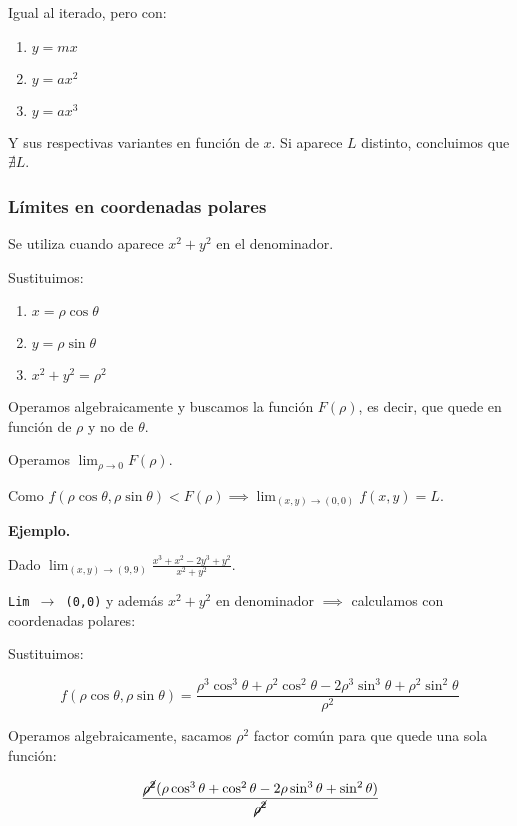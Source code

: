 Igual al iterado, pero con:

\begin{enumerate}
    \item \(y = mx\)
    \item \(y = ax^{2}\)
    \item \(y = ax^{3}\)
\end{enumerate}

Y sus respectivas variantes en función de \(x\).
Si aparece \(L\) distinto, concluimos que \(\nexists L\).

\subsubsection{Límites en coordenadas polares}


Se utiliza cuando aparece \(x^{2} + y^{2}\) en el denominador.

Sustituimos:
\begin{enumerate}
    \item \(x = \rho \cos\theta\)
    \item \(y = \rho \sin\theta\)
    \item \(x^{2} + y^{2} = \rho^{2}\)
\end{enumerate}

Operamos algebraicamente y buscamos la función \(F(\rho)\),
es decir, que quede en función de \(\rho\) y no de \(\theta\).

Operamos \(\lim_{\rho\to0} F(\rho)\).

Como \(f(\rho\cos\theta,\rho\sin\theta) < F(\rho) \implies \lim_{(x,y)\to(0,0)}f(x,y) = L\).

\textbf{Ejemplo.}

Dado \(\lim_{(x,y)\to(9,9)}\frac{x^{3} + x^{2} - 2y^{3} + y^{2}}{x^{2} + y^{2}}\).

\texttt{Lim \(\to\) (0,0)} y además \texttt{\(x^{2} + y^{2}\)} en denominador \(\implies\) calculamos con coordenadas polares:

Sustituimos:

\begin{equation*}
    f(\rho\cos\theta,\rho\sin\theta) = \frac{\rho^{3}\cos^{3}\theta + \rho^{2}\cos^{2}\theta - 2\rho^{3}\sin^{3}\theta + \rho^{2}\sin^{2}\theta}{\rho^{2}}
\end{equation*}

Operamos algebraicamente, sacamos \(\rho^{2}\) factor común para que quede una sola función:

\begin{equation*}
    \frac{\cancel{\rho^{2}}(\rho\cos^{3}\theta + \cos^{2}\theta - 2\rho\sin^{3}\theta + \sin^{2}\theta)}{\cancel{\rho^{2}}}
\end{equation*}

